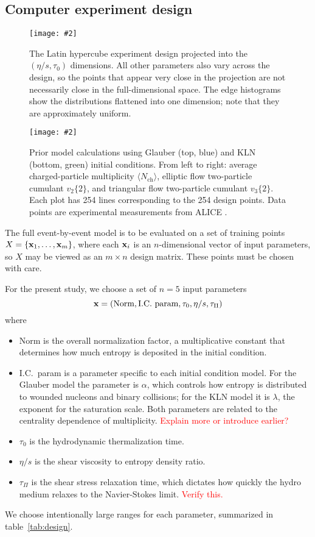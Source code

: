 \documentclass[aps,prc,reprint,amsmath]{revtex4-1}
\newcommand{\todo}[1]{\textcolor{red}{#1}}
\newcommand{\colfig}[3][t]{
  \begin{figure}[#1]
    \texttt{[image: \#2]}
    \caption{\label{fig:#2}#3}
  \end{figure}
}
\newcommand{\widefig}[3][t]{
  \begin{figure*}[#1]
    \texttt{[image: \#2]}
    \caption{\label{fig:#2}#3}
  \end{figure*}
}
\newcommand{\avg}[1]{\langle #1 \rangle}
\newcommand{\nch}{N_\text{ch}}
\newcommand{\vnk}[2]{v_#1\{#2\}}
\begin{document}
\subsection{Computer experiment design}

\colfig[b]{design}{
  The Latin hypercube experiment design projected into the $(\eta/s, \tau_0)$ dimensions.
  All other parameters also vary across the design, so the points that appear very close in the projection are not necessarily close in the full-dimensional space.
  The edge histograms show the distributions flattened into one dimension; note that they are approximately uniform.
}

\widefig{prior_draws}{
  Prior model calculations using Glauber (top, blue) and KLN (bottom, green) initial conditions.
  From left to right:
  average charged-particle multiplicity $\avg\nch$,
  elliptic flow two-particle cumulant $\vnk 2 2$,
  and triangular flow two-particle cumulant $\vnk 3 2$.
  Each plot has 254 lines corresponding to the 254 design points.
  Data points are experimental measurements from ALICE \cite{Abelev:2014mda}.
}

The full event-by-event model is to be evaluated on a set of training points $X = \{\mathbf x_1, \ldots, \mathbf x_m\}$, where each $\mathbf x_i$ is an $n$-dimensional vector of input parameters, so $X$ may be viewed as an $m \times n$ design matrix.
These points must be chosen with care.

For the present study, we choose a set of $n = 5$ input parameters
\begin{equation}
  \mathbf x = (\text{Norm}, \text{I.C.\ param}, \tau_0, \eta/s, \tau_\Pi)
\end{equation}
where
\begin{itemize}
  \item Norm is the overall normalization factor, a multiplicative constant that determines how much entropy is deposited in the initial condition.
  \item I.C.\ param is a parameter specific to each initial condition model.
    For the Glauber model the parameter is $\alpha$, which controls how entropy is distributed to wounded nucleons and binary collisions;
    for the KLN model it is $\lambda$, the exponent for the saturation scale.
    Both parameters are related to the centrality dependence of multiplicity.
    \todo{Explain more or introduce earlier?}
  \item $\tau_0$ is the hydrodynamic thermalization time.
  \item $\eta/s$ is the shear viscosity to entropy density ratio.
  \item $\tau_\Pi$ is the shear stress relaxation time, which dictates how quickly the hydro medium relaxes to the Navier-Stokes limit.
    \todo{Verify this.}
\end{itemize}
We choose intentionally large ranges for each parameter, summarized in table~\ref{tab:design}.
\end{document}
